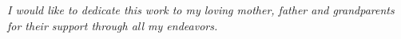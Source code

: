 \clearpage
\vspace*{\fill}
	\begin{center}
		\begin{minipage}{\textwidth}
				\textit{I would like to dedicate this work to my loving mother, father and grandparents for their support through all my endeavors.}
		\end{minipage}
	\end{center}
\vfill %
\clearpage